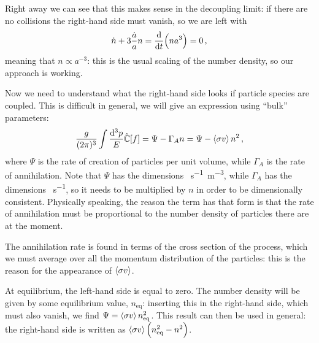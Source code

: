 \documentclass[main.tex]{subfiles}
\begin{document}

Right away we can see that this makes sense in the decoupling limit: if there are no collisions the right-hand side must vanish, so we are left with 
%
\begin{align}
\dot{n} + 3 \frac{\dot{a}}{a} n = \dv{}{t} \qty(n a^3) = 0
\,,
\end{align}
%
meaning that \(n \propto a^{-3}\): this is the usual scaling of the number density, so our approach is working. 

Now we need to understand what the right-hand side looks if particle species are coupled. This is difficult in general, we will give an expression using ``bulk'' parameters:
%
\begin{align}
  \frac{g}{(2 \pi )^3} \int \frac{ \dd[3]{p}}{E} \hat{\mathbb{C}}[f] 
  = \Psi - \Gamma_A n
  = \Psi - \expval{\sigma v } n^2
\,,
\end{align}
%
where \(\Psi \) is the rate of creation of particles per unit volume, while \(\Gamma_A\) is the rate of annihilation. Note that \(\Psi \) has the dimensions \SI{}{s^{-1} m^{-3}}, while \(\Gamma _A\) has the dimensions \SI{}{s^{-1}}, so it needs to be multiplied by \(n\) in order to be dimensionally consistent. 
Physically speaking, the reason the term has that form is that the rate of annihilation must be proportional to the number density of particles there are at the moment.

The annihilation rate is found in terms of the cross section of the process, which we must average over all the momentum distribution of the particles: this is the reason for the appearance of \(\expval{\sigma v}\).


At equilibrium, the left-hand side is equal to zero. The number density will be given by some equilibrium value, \(n _{\text{eq}}\): inserting this in the right-hand side, which must also vanish, we find \(\Psi = \expval{\sigma v} n^2 _{\text{eq}}\).
This result can then be used in general: the right-hand side is written as \(\expval{\sigma v} \qty(n^2 _{\text{eq}} - n^2)\).
\end{document}
